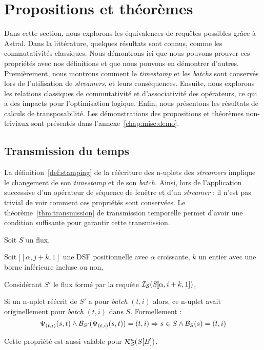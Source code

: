 \section{Propositions et théorèmes}\label{sec:valid:expressivite:theoremes}
Dans cette section, nous explorons les équivalences de requêtes possibles grâce à Astral. Dans la littérature, quelques résultats sont connus, comme les commutativités classiques. Nous démontrons ici que nous pouvons prouver ces propriétés avec nos définitions et que nous pouvons en démontrer d'autres. Premièrement, nous montrons comment le \textit{timestamp} et les \textit{batchs} sont conservés lors de l'utilisation de \textit{streamers}, et leurs conséquences. Ensuite, nous explorons les relations classiques de commutativité et d'associativité des opérateurs, ce qui a des impacts pour l'optimisation logique. Enfin, nous présentons les résultats de calculs de transposabilité. Les démonstrations des propositions et théorèmes non-triviaux sont présentés dans l'annexe~\ref{chap:misc:demo}.

\subsection{Transmission du temps}
La définition~\ref{def:stamping} de la réécriture des n-uplets des \textit{streamers} implique le changement de son \textit{timestamp} et de son \textit{batch}. Ainsi, lors de l'application successive d'un opérateur de séquence de fenêtre et d'un \textit{streamer} : il n'est pas trivial de voir comment ces propriétés sont conservées. Le théorème~\ref{thm:transmission} de transmission temporelle permet d'avoir une condition suffisante pour garantir cette transmission.

\begin{thm}\label{thm:transmission}
    Soit $S$ un flux,

    Soit $]\!\![\alpha,j+k,1]$ une DSF positionnelle avec $\alpha$ croissante, $k$ un entier avec une borne inférieure incluse ou non,

    Considérant $S'$ le flux formé par la requête $\mathcal{I_S}(S]\!\![\alpha,i+k,1])$,

    Si un n-uplet réécrit de $S'$ a pour \textit{batch} $(t,i)$ alors, ce n-uplet avait originellement pour \textit{batch} $(t,i)$ dans $S$. Formellement :
$$\Psi_{(t,i)}(s,t) \wedge \mathcal{B}_{S'}(\Psi_{(t,i)}(s,t)) = (t,i) \Rightarrow s\in S \wedge \mathcal{B}_S(s) = (t,i)$$

    Cette propriété est aussi valable pour $\mathcal{R}_{\mathcal S}^{u}(S[B])$.
\end{thm}

